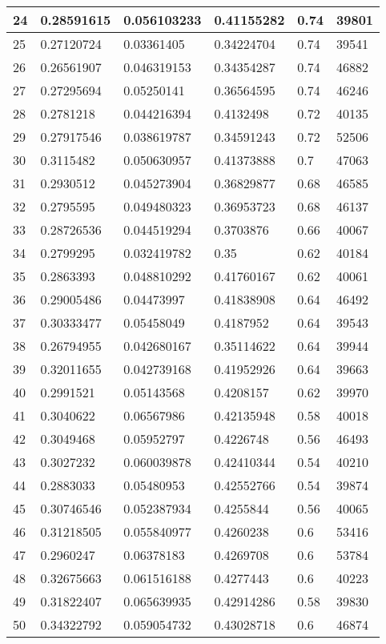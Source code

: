 \begin{longtable}{|l|l|l|l|l|l|}
24 & 0.28591615 & 0.056103233 & 0.41155282 & 0.74 & 39801 \\ \hline 
25 & 0.27120724 & 0.03361405 & 0.34224704 & 0.74 & 39541 \\ \hline 
26 & 0.26561907 & 0.046319153 & 0.34354287 & 0.74 & 46882 \\ \hline 
27 & 0.27295694 & 0.05250141 & 0.36564595 & 0.74 & 46246 \\ \hline 
28 & 0.2781218 & 0.044216394 & 0.4132498 & 0.72 & 40135 \\ \hline 
29 & 0.27917546 & 0.038619787 & 0.34591243 & 0.72 & 52506 \\ \hline 
30 & 0.3115482 & 0.050630957 & 0.41373888 & 0.7 & 47063 \\ \hline 
31 & 0.2930512 & 0.045273904 & 0.36829877 & 0.68 & 46585 \\ \hline 
32 & 0.2795595 & 0.049480323 & 0.36953723 & 0.68 & 46137 \\ \hline 
33 & 0.28726536 & 0.044519294 & 0.3703876 & 0.66 & 40067 \\ \hline 
34 & 0.2799295 & 0.032419782 & 0.35 & 0.62 & 40184 \\ \hline 
35 & 0.2863393 & 0.048810292 & 0.41760167 & 0.62 & 40061 \\ \hline 
36 & 0.29005486 & 0.04473997 & 0.41838908 & 0.64 & 46492 \\ \hline 
37 & 0.30333477 & 0.05458049 & 0.4187952 & 0.64 & 39543 \\ \hline 
38 & 0.26794955 & 0.042680167 & 0.35114622 & 0.64 & 39944 \\ \hline 
39 & 0.32011655 & 0.042739168 & 0.41952926 & 0.64 & 39663 \\ \hline 
40 & 0.2991521 & 0.05143568 & 0.4208157 & 0.62 & 39970 \\ \hline 
41 & 0.3040622 & 0.06567986 & 0.42135948 & 0.58 & 40018 \\ \hline 
42 & 0.3049468 & 0.05952797 & 0.4226748 & 0.56 & 46493 \\ \hline 
43 & 0.3027232 & 0.060039878 & 0.42410344 & 0.54 & 40210 \\ \hline 
44 & 0.2883033 & 0.05480953 & 0.42552766 & 0.54 & 39874 \\ \hline 
45 & 0.30746546 & 0.052387934 & 0.4255844 & 0.56 & 40065 \\ \hline 
46 & 0.31218505 & 0.055840977 & 0.4260238 & 0.6 & 53416 \\ \hline 
47 & 0.2960247 & 0.06378183 & 0.4269708 & 0.6 & 53784 \\ \hline 
48 & 0.32675663 & 0.061516188 & 0.4277443 & 0.6 & 40223 \\ \hline 
49 & 0.31822407 & 0.065639935 & 0.42914286 & 0.58 & 39830 \\ \hline 
50 & 0.34322792 & 0.059054732 & 0.43028718 & 0.6 & 46874 \\ \hline 
\end{longtable}